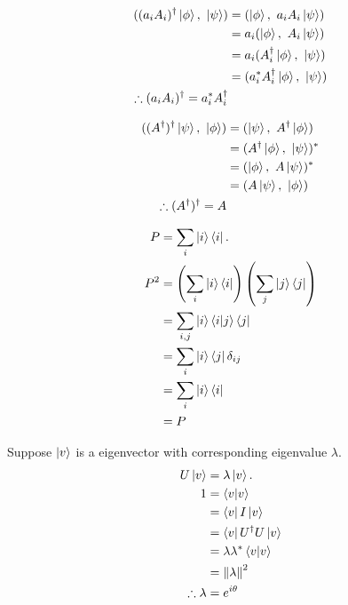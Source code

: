 \begin{align*}
	( (a_i A_i)^\dagger \ket{\phi},\ \ket{\psi} )
	&= (\ket{\phi},\ a_i A_i \ket{\psi})\\
	&= a_i (\ket{\phi},\ A_i \ket{\psi})\\
	&= a_i (A_i^\dagger \ket{\phi},\ \ket{\psi})\\
	&= (a_i^* A_i^\dagger \ket{\phi},\ \ket{\psi})\\
%
	\therefore (a_i A_i)^\dagger = a_i^* A_i^\dagger
\end{align*}




\begin{align*}
	((A^\dagger)^\dagger\ket{\psi},\ \ket{\phi} )
	&= (\ket{\psi},\ A^\dagger \ket{\phi})\\
	&= (A^\dagger \ket{\phi},\ \ket{\psi})^*\\
	&= (\ket{\phi},\ A\ket{\psi})^*\\
	&= (A\ket{\psi},\ \ket{\phi})\\
	\therefore (A^\dagger)^\dagger = A
\end{align*}


\begin{align*}
	P &= \sum_i \ket{i}\bra{i}.\\
	P^2 &= \left(\sum_i \ket{i}\bra{i}\right) \left(\sum_j \ket{j}\bra{j}\right)\\
	&= \sum_{i,j} \ket{i}\braket{i | j}\bra{j}\\
	&= \sum_i \ket{i}\bra{j} \delta_{ij}\\
	&= \sum_i \ket{i}\bra{i}\\
	&= P
\end{align*}





Suppose $\ket{v}$ is a eigenvector with corresponding eigenvalue $\lambda$.
\begin{align*}
	U \ket{v} &= \lambda \ket{v}.\\
	1 &= \braket{v | v}\\
	&= \bra{v} I \ket{v}\\
	&= \bra{v} U^\dagger U \ket{v}\\
	&= \lambda \lambda^* \braket{v | v}\\
	&= \left\lVert\lambda\right\rVert^2\\
	\therefore \lambda &= e^{i \theta}
\end{align*}




